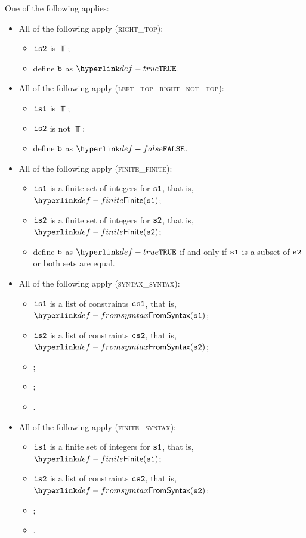 \ProseParagraph
One of the following applies:
\begin{itemize}
  \item All of the following apply (\textsc{right\_top}):
  \begin{itemize}
    \item $\texttt{is2}$ is $\Top$;
    \item define $\texttt{b}$ as $\True$.
  \end{itemize}

  \item All of the following apply (\textsc{left\_top\_right\_not\_top}):
  \begin{itemize}
    \item $\texttt{is1}$ is $\Top$;
    \item $\texttt{is2}$ is not $\Top$;
    \item define $\texttt{b}$ as $\False$.
  \end{itemize}

  \item All of the following apply (\textsc{finite\_finite}):
  \begin{itemize}
    \item $\texttt{is1}$ is a finite set of integers for $\vsone$, that is, $\Finite(\vsone)$;
    \item $\texttt{is2}$ is a finite set of integers for $\vstwo$, that is, $\Finite(\vstwo)$;
    \item define $\texttt{b}$ as $\True$ if and only if $\vsone$ is a subset of $\vstwo$ or both sets are equal.
  \end{itemize}

  \item All of the following apply (\textsc{syntax\_syntax}):
  \begin{itemize}
    \item $\texttt{is1}$ is a list of constraints $\csone$, that is, $\FromSyntax(\vsone)$;
    \item $\texttt{is2}$ is a list of constraints $\cstwo$, that is, $\FromSyntax(\vstwo)$;
    \item \ProseapproxconstraintsOver{$\tenv$}{$\csone$}{$\vsone$};
    \item \ProseapproxconstraintsUnder{$\tenv$}{$\cstwo$}{$\vstwo$};
    \item {}.
  \end{itemize}

  \item All of the following apply (\textsc{finite\_syntax}):
  \begin{itemize}
    \item $\texttt{is1}$ is a finite set of integers for $\vsone$, that is, $\Finite(\vsone)$;
    \item $\texttt{is2}$ is a list of constraints $\cstwo$, that is, $\FromSyntax(\vstwo)$;
    \item \ProseapproxconstraintsUnder{$\tenv$}{$\cstwo$}{$\vstwo$};
    \item {}.
  \end{itemize}


\end{itemize}
